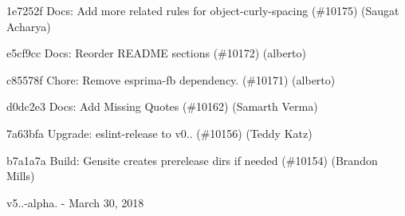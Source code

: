 \begin{DoxyItemize}
\item 1e7252f Docs\+: Add more related rules for object-\/curly-\/spacing (\#10175) (Saugat Acharya)
\item e5cf9cc Docs\+: Reorder R\+E\+A\+D\+ME sections (\#10172) (alberto)
\item c85578f Chore\+: Remove {\ttfamily esprima-\/fb} dependency. (\#10171) (alberto)
\item d0dc2e3 Docs\+: Add Missing Quotes (\#10162) (Samarth Verma)
\item 7a63bfa Upgrade\+: eslint-\/release to v0.. (\#10156) (Teddy Katz)
\item b7a1a7a Build\+: Gensite creates prerelease dirs if needed (\#10154) (Brandon Mills)
\end{DoxyItemize}

v5..-\/alpha. -\/ March 30, 2018


